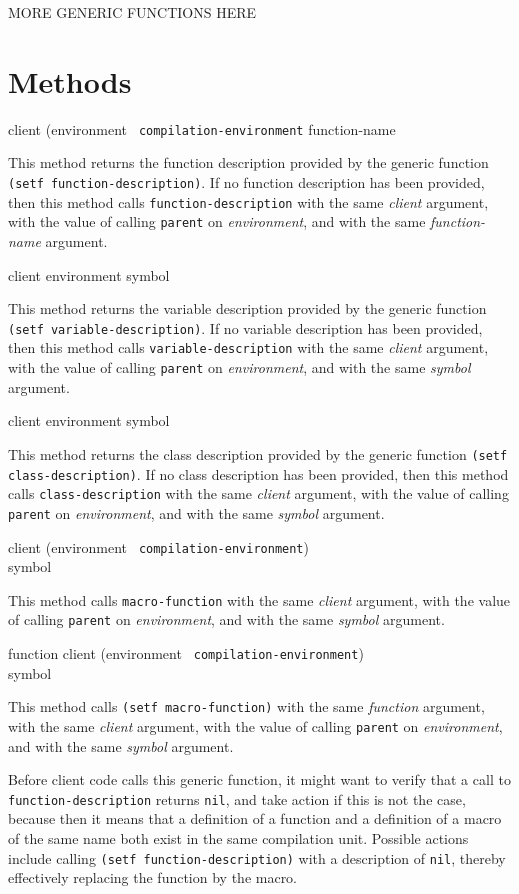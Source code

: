 MORE GENERIC FUNCTIONS HERE

\section{Methods}

 {client (environment {\tt
    compilation-environment} function-name}

This method returns the function description provided by the generic
function \texttt{(setf function-description)}. If no function
description has been provided, then this method calls
\texttt{function-description} with the same \textit{client} argument,
with the value of calling \texttt{parent} on \textit{environment}, and
with the same \textit{function-name} argument.

 {client environment symbol}

This method returns the variable description provided by the generic
function \texttt{(setf variable-description)}. If no variable
description has been provided, then this method calls
\texttt{variable-description} with the same \textit{client} argument,
with the value of calling \texttt{parent} on \textit{environment}, and
with the same \textit{symbol} argument.

 {client environment symbol}

This method returns the class description provided by the generic function
\texttt{(setf class-description)}. If no class description has been provided,
then this method calls \texttt{class-description} with the same
\textit{client} argument, with the value of calling \texttt{parent} on
\textit{environment}, and with the same \textit{symbol} argument.

{\small{} {client (environment {\tt
      compilation-environment}) \\ symbol}
}

This method calls \texttt{macro-function} with the same
\textit{client} argument, with the value of calling \texttt{parent} on
\textit{environment}, and with the same \textit{symbol} argument.

{\small{} {function client (environment {\tt
      compilation-environment}) \\ symbol}
}

This method calls \texttt{(setf macro-function)} with the same
\textit{function} argument, with the same \textit{client} argument, with
the value of calling \texttt{parent} on \textit{environment}, and with
the same \textit{symbol} argument.

Before client code calls this generic function, it might want to
verify that a call to \texttt{function-description} returns
\texttt{nil}, and take action if this is not the case, because then it
means that a definition of a function and a definition of a macro of
the same name both exist in the same compilation unit.  Possible
actions include calling \texttt{(setf function-description)} with a
description of \texttt{nil}, thereby effectively replacing the
function by the macro.
